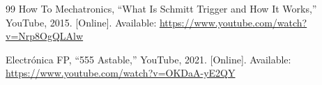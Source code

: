 \documentclass[11pt]{article}
\newcounter{entrycount}
\newcommand{\logentry}[3]{%
  \refstepcounter{entrycount}%
  \section*{Bitácora \#\theentrycount: #1}%
  \hfill\textit{#2}\\[0.2cm]
  #3
  \vspace{0.5cm}
  \hrule
  \vspace{0.5cm}
}
\begin{document}
	\begin{thebibliography}{99}
	How To Mechatronics, ``What Is Schmitt Trigger and How It Works,'' YouTube, 2015. [Online]. Available: \url{https://www.youtube.com/watch?v=Nrp8OgQLAlw}

	Electrónica FP, ``555 Astable,'' YouTube, 2021. [Online]. Available: \url{https://www.youtube.com/watch?v=OKDaA-yE2QY}

	\end{thebibliography}
%     
%     
%     
\end{document}
